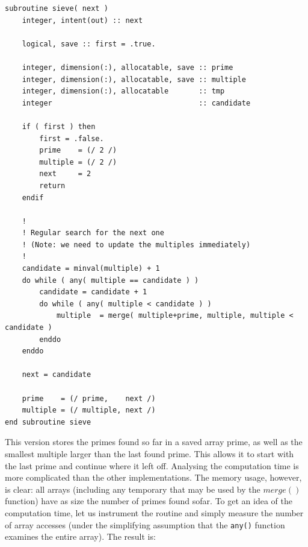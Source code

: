 \documentclass[onecolumn]{article}
\begin{document}
\begin{verbatim}
subroutine sieve( next )
    integer, intent(out) :: next

    logical, save :: first = .true.

    integer, dimension(:), allocatable, save :: prime
    integer, dimension(:), allocatable, save :: multiple
    integer, dimension(:), allocatable       :: tmp
    integer                                  :: candidate

    if ( first ) then
        first = .false.
        prime    = (/ 2 /)
        multiple = (/ 2 /)
        next     = 2
        return
    endif

    !
    ! Regular search for the next one
    ! (Note: we need to update the multiples immediately)
    !
    candidate = minval(multiple) + 1
    do while ( any( multiple == candidate ) )
        candidate = candidate + 1
        do while ( any( multiple < candidate ) )
            multiple  = merge( multiple+prime, multiple, multiple < candidate )
        enddo
    enddo

    next = candidate

    prime    = (/ prime,    next /)
    multiple = (/ multiple, next /)
end subroutine sieve
\end{verbatim}

This version stores the primes found so far in a saved array prime, as well as the smallest multiple larger
than the last found prime. This allows it to start with the last prime and continue where it left off.
Analysing the computation time is more complicated than the other implementations.
The memory usage, however, is clear: all arrays (including any temporary that may be used by
the $merge()$ function) have as size the number of primes found sofar. To get an idea of the
computation time, let us instrument the routine and simply measure the number of array accesses
(under the simplifying assumption that the \verb+any()+ function examines the entire array).
The result is:
\end{document}
